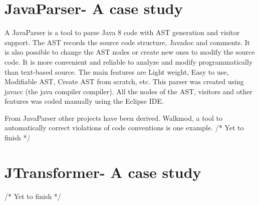  
 \section{JavaParser- A case study}
 A JavaParser is a tool to parse Java 8 code with AST generation and visitor support. The AST records the source code structure, Javadoc and comments. It is also possible to change the AST nodes or create new ones to modify the source code. It is more convenient and reliable to analyze and modify programmatically than text-based source. The main features are Light weight, Easy to use, Modifiable AST, Create AST from scratch, etc. This parser was created using javacc (the java compiler compiler). All the nodes of the AST, visitors and other features was coded manually using the Eclipse IDE.
 
 From JavaParser other projects have been derived. Walkmod\cite{walkmod}, a tool to automatically correct violations of code conventions is one example.
 /* Yet to finish */
 \section{JTransformer- A case study}
/* Yet to finish */
